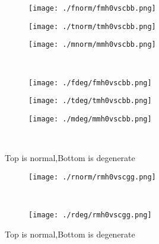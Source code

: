 \documentclass[aps,floats,floatfix,nofootinbib]{revtex4-1}
\begin{document}
\begin{center}
\begin{figure}
\begin{subfigure}{0.3\textwidth}
\texttt{[image: ./fnorm/fmh0vscbb.png]}
\label{}
\end{subfigure}
\begin{subfigure}{0.3\textwidth}
\texttt{[image: ./tnorm/tmh0vscbb.png]}
\label{}
\end{subfigure}
\begin{subfigure}{0.3\textwidth}
\texttt{[image: ./mnorm/mmh0vscbb.png]}
\label{}
\end{subfigure}\\
\begin{subfigure}{0.3\textwidth}
\texttt{[image: ./fdeg/fmh0vscbb.png]}
\label{}
\end{subfigure}
\begin{subfigure}{0.3\textwidth}
\texttt{[image: ./tdeg/tmh0vscbb.png]}
\label{}
\end{subfigure}
\begin{subfigure}{0.3\textwidth}
\texttt{[image: ./mdeg/mmh0vscbb.png]}
\label{}
\end{subfigure}\\
\caption{Top is normal,Bottom is degenerate}
\end{figure}
\end{center}

\begin{center}
\begin{figure}
\begin{subfigure}{0.95\textwidth}
\texttt{[image: ./rnorm/rmh0vscgg.png]}
\label{}
\end{subfigure}\\
\begin{subfigure}{0.95\textwidth}
\texttt{[image: ./rdeg/rmh0vscgg.png]}
\label{}
\end{subfigure}
\caption{Top is normal,Bottom is degenerate}
\end{figure}
\end{center}
\end{document}
